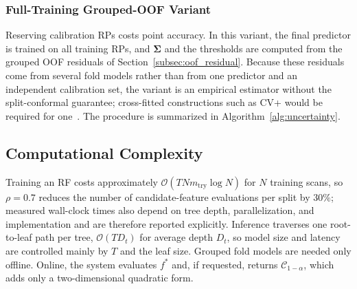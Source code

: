 \subsubsection{Full-Training Grouped-OOF Variant}
\label{subsec:empirical_oof}
Reserving calibration RPs costs point accuracy. In this variant, the final predictor is trained on all training RPs, and $\boldsymbol{\Sigma}$ and the thresholds are computed from the grouped OOF residuals of Section~\ref{subsec:oof_residual}. Because these residuals come from several fold models rather than from one predictor and an independent calibration set, the variant is an empirical estimator without the split-conformal guarantee; cross-fitted constructions such as CV+ would be required for one~\cite{barber2021jackknife}. The procedure is summarized in Algorithm~\ref{alg:uncertainty}.



\subsection{Computational Complexity}
\label{subsec:complexity}

Training an RF costs approximately $\mathcal{O}(T N m_{\mathrm{try}}\log N)$ for $N$ training scans, so $\rho=0.7$ reduces the number of candidate-feature evaluations per split by $30\%$; measured wall-clock times also depend on tree depth, parallelization, and implementation and are therefore reported explicitly. Inference traverses one root-to-leaf path per tree, $\mathcal{O}(T D_t)$ for average depth $D_t$, so model size and latency are controlled mainly by $T$ and the leaf size. Grouped fold models are needed only offline. Online, the system evaluates $f^{*}$ and, if requested, returns $\mathcal{C}_{1-\alpha}$, which adds only a two-dimensional quadratic form.
